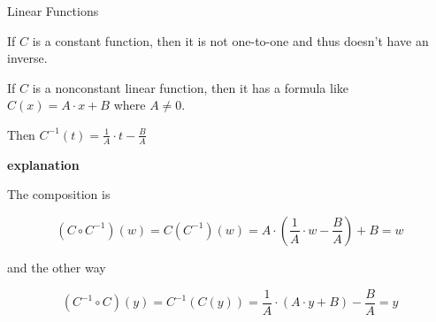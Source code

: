 \documentclass{ximera}
\begin{document}
\begin{example} Linear Functions

If $C$ is a constant function, then it is not one-to-one and thus doesn't have an inverse. 


If $C$ is a nonconstant linear function, then it has a formula like $C(x) = A \cdot x + B$ where $A \ne 0$.


Then $C^{-1}(t) = \frac{1}{A} \cdot t - \frac{B}{A}$


\textbf{\textcolor{red!75!green}{explanation}} 



The composition is 

\[  (C \circ C^{-1})(w) = C(C^{-1})(w) =     A \cdot \left(\frac{1}{A} \cdot w - \frac{B}{A}\right) + B  = w \]


and the other way


\[  (C^{-1} \circ C)(y) = C^{-1}(C(y)) =     \frac{1}{A} \cdot (A \cdot y + B) - \frac{B}{A}  = y \]





\end{example}
\end{document}
